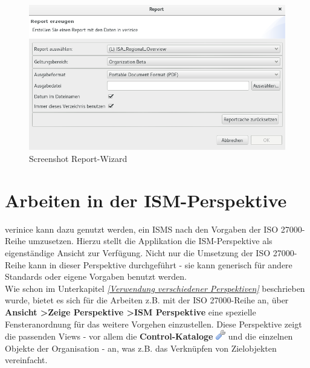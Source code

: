 \documentclass[a4paper,10pt]{book}
\begin{document}
\begin{figure}[htb!]
  \centering
  \includegraphics[scale=.45]{Screenshot/Report_erzeugen.png}
  \caption{Screenshot Report-Wizard}
  \label{fig:report-wizard}
\end{figure}

\chapter{Arbeiten in der ISM-Perspektive}\label{Arbeiten in der ISM-Perspektive}
verinice kann dazu genutzt werden, ein ISMS nach den Vorgaben der ISO 27000-Reihe umzusetzen. Hierzu stellt die Applikation
die ISM-Perspektive als eigenständige Ansicht zur Verfügung. Nicht nur die Umsetzung der ISO 27000-Reihe kann in dieser Perspektive
durchgeführt - sie kann generisch für andere Standards oder eigene Vorgaben benutzt werden.
\newline\\
Wie schon im Unterkapitel {\em \ref{Verwendung verschiedener Perspektiven} } beschrieben wurde, bietet es sich für die Arbeiten z.B. mit der
ISO 27000-Reihe an, über \textbf{Ansicht \textgreater Zeige Perspektive \textgreater ISM Perspektive }eine spezielle
Fensteranordnung für das weitere Vorgehen einzustellen. Diese Perspektive zeigt die passenden Views  - vor allem die
\textbf{Control-Kataloge} \includegraphics[height=2ex]{Icon/Control_Kataloge.png} und die einzelnen Objekte der Organisation - an,
was z.B. das Verknüpfen von Zielobjekten vereinfacht.
\end{document}

